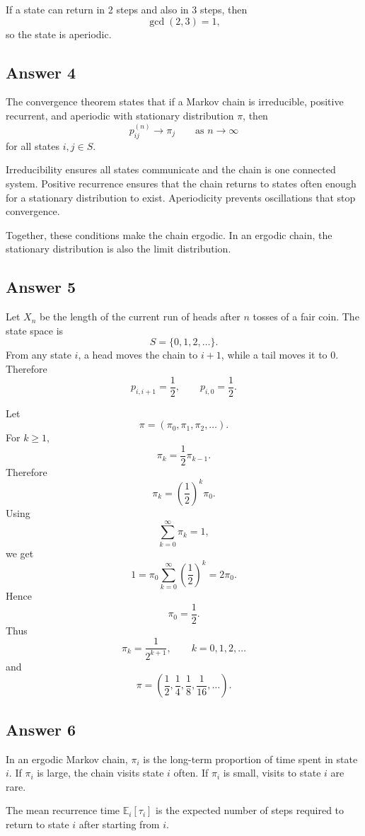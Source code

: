 \documentclass[12pt,a4paper]{article}
\theoremstyle{lecturestyle}
\newcommand{\E}{\mathbb{E}}
\begin{document}
If a state can return in 2 steps and also in 3 steps, then
\[
\gcd(2,3)=1,
\]
so the state is aperiodic.

\subsection*{Answer 4}

The convergence theorem states that if a Markov chain is irreducible, positive recurrent, and aperiodic with stationary distribution $\pi$, then
\[
p_{ij}^{(n)}\to\pi_j
\qquad\text{as }n\to\infty
\]
for all states $i,j\in S$.

Irreducibility ensures all states communicate and the chain is one connected system. Positive recurrence ensures that the chain returns to states often enough for a stationary distribution to exist. Aperiodicity prevents oscillations that stop convergence.

Together, these conditions make the chain ergodic. In an ergodic chain, the stationary distribution is also the limit distribution.

\subsection*{Answer 5}

Let $X_n$ be the length of the current run of heads after $n$ tosses of a fair coin. The state space is
\[
S=\{0,1,2,\ldots\}.
\]
From any state $i$, a head moves the chain to $i+1$, while a tail moves it to 0. Therefore
\[
p_{i,i+1}=\frac12,
\qquad
p_{i,0}=\frac12.
\]

Let
\[
\pi=(\pi_0,\pi_1,\pi_2,\ldots).
\]
For $k\geq1$,
\[
\pi_k=\frac12\pi_{k-1}.
\]
Therefore
\[
\pi_k=\left(\frac12\right)^k\pi_0.
\]
Using
\[
\sum_{k=0}^{\infty}\pi_k=1,
\]
we get
\[
1=\pi_0\sum_{k=0}^{\infty}\left(\frac12\right)^k=2\pi_0.
\]
Hence
\[
\pi_0=\frac12.
\]
Thus
\[
\pi_k=\frac1{2^{k+1}},
\qquad k=0,1,2,\ldots
\]
and
\[
\pi=\left(\frac12,\frac14,\frac18,\frac1{16},\ldots\right).
\]

\subsection*{Answer 6}

In an ergodic Markov chain, $\pi_i$ is the long-term proportion of time spent in state $i$. If $\pi_i$ is large, the chain visits state $i$ often. If $\pi_i$ is small, visits to state $i$ are rare.

The mean recurrence time $\E_i[\tau_i]$ is the expected number of steps required to return to state $i$ after starting from $i$.
\end{document}
